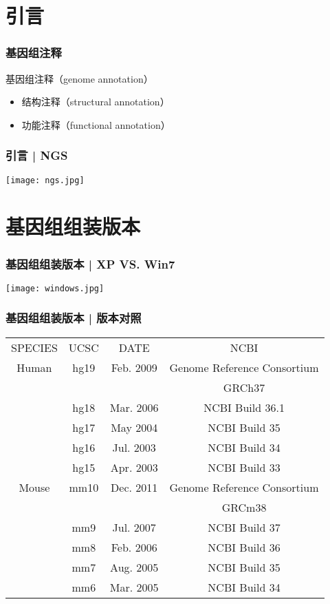 \section{引言}
\begin{frame}
	\frametitle{基因组注释}
	\begin{block}{基因组注释（genome annotation）}
		\begin{itemize}
			\item 结构注释（structural annotation）
			\item 功能注释（functional annotation）
		\end{itemize}
	\end{block}
\end{frame}

\begin{frame}
	\frametitle{引言 | NGS}
	\begin{center}
		\texttt{[image: ngs.jpg]}
	\end{center}
\end{frame}

\section{基因组组装版本}
\begin{frame}
	\frametitle{基因组组装版本 | XP VS. Win7}
	\begin{center}
		\texttt{[image: windows.jpg]}
	\end{center}
\end{frame}

\begin{frame}
	\frametitle{基因组组装版本 | 版本对照}
	\begin{table}
		\centering
		\begin{tabular}{cccc}
			\hline
			\rowcolor{blue!50} SPECIES & UCSC & DATE & NCBI\\
			Human & hg19 & Feb. 2009 & Genome Reference Consortium\\
			 & & & GRCh37\\
			 & hg18 & Mar. 2006 & NCBI Build 36.1\\
			 & hg17 & May 2004 & NCBI Build 35\\
			 & hg16 & Jul. 2003 & NCBI Build 34\\
			 & hg15 & Apr. 2003 & NCBI Build 33\\
			\hline
			Mouse & mm10 & Dec. 2011 & Genome Reference Consortium\\
			 & & & GRCm38\\
			 & mm9 & Jul. 2007 & NCBI Build 37\\
			 & mm8 & Feb. 2006 & NCBI Build 36\\
			 & mm7 & Aug. 2005 & NCBI Build 35\\
			 & mm6 & Mar. 2005 & NCBI Build 34\\
			\hline
		\end{tabular}
	\end{table}
\end{frame}

